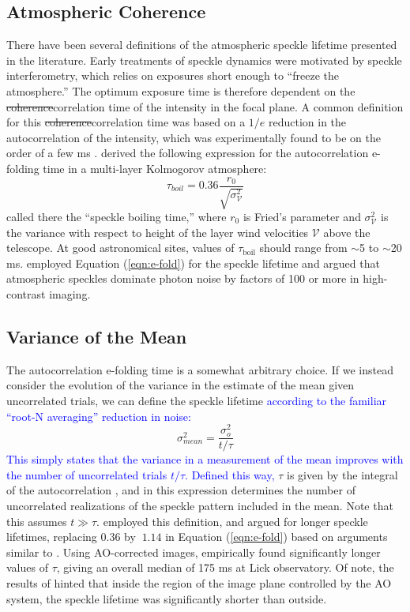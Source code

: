 \documentclass[10pt,preprint]{aastex631}
\newcommand{\jrmadd}[1]{\textcolor{blue}{#1}}
\newcommand{\mpfadd}[1]{\textcolor{avocado}{#1}}
\newcommand{\mpfrmv}[1]{\textcolor{avocado}{\sout{#1}}}
\begin{document}
\subsection{Atmospheric Coherence}
There have been several definitions of the atmospheric speckle lifetime presented in the literature.  Early treatments of speckle dynamics were motivated by speckle interferometry, which relies on exposures short enough to ``freeze the atmosphere.''  The optimum exposure time is therefore dependent on the \mpfrmv{coherence}\mpfadd{correlation} time of the intensity in the focal plane.  A common definition for this \mpfrmv{coherence}\mpfadd{correlation} time was based on a $1/e$ reduction in the autocorrelation of the intensity, which was experimentally found to be on the order of a few ms \citep{1978ApOpt..17.3779S,1990JMOp...37.1247D}.    \citet{1982JOpt...13..263R} derived the following expression for the autocorrelation e-folding time in a multi-layer Kolmogorov atmosphere:
\begin{equation}
\tau_{boil} = 0.36 \frac{r_0}{\sqrt{\sigma^2_\mathcal{V}}}
\label{eqn:e-fold}
\end{equation}
called there the ``speckle boiling time,'' where $r_0$ is Fried's parameter and $\sigma^2_\mathcal{V}$ is the variance with respect to height of the layer wind velocities $\mathcal{V}$  above the telescope.  At good astronomical sites, values of $\tau_\text{boil}$ should range from $\sim$5 to $\sim$20 ms. \citet{1999PASP..111..587R} employed Equation (\ref{eqn:e-fold}) for the speckle lifetime and argued that atmospheric speckles dominate photon noise by factors of 100 or more in high-contrast imaging.

\subsection{Variance of the Mean}
The autocorrelation e-folding time is a somewhat arbitrary choice.  If we instead consider the evolution of the variance in the estimate of the mean given uncorrelated trials, we can define the speckle lifetime \jrmadd{according to the familiar ``root-N averaging'' reduction in noise:}
\begin{equation}
\sigma_{mean}^2 = \frac{\sigma_o^2}{t/\tau}
\label{eqn:varmean_def_intro}
\end{equation}
\jrmadd{This simply states that the variance in a measurement of the mean improves with the number of uncorrelated trials $t/\tau$.  Defined this way,} $\tau$ is given by the integral of the autocorrelation \citep{2006ApJ...637..541F}, and in this expression determines the number of uncorrelated realizations of the speckle pattern included in the mean.  Note that this assumes $t \gg \tau$.  \citet{1986JOSAA...3.1001A} employed this definition, and argued for longer speckle lifetimes, replacing $0.36$ by $~$$1.14$ in Equation (\ref{eqn:e-fold}) based on arguments similar to \citet{1982JOpt...13..263R}.  Using AO-corrected images, \citet{2006ApJ...637..541F} empirically found significantly longer values of $\tau$, giving an overall median of 175 ms at Lick observatory.  Of note, the results of \citet{2006ApJ...637..541F} hinted that inside the region of the image plane controlled by the AO system, the speckle lifetime was significantly shorter than outside.
\end{document}
